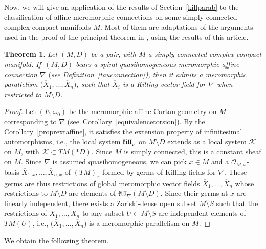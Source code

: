 \documentclass[pdftex]{sigma}
\numberwithin{equation}{section}
\newtheorem{Theorem}{Theorem}[section]
\begin{document}
Now, we will give an application of the results of Section~\ref{killparab} to the classification of affine meromorphic connections on some simply connected complex compact manifolds $M$. Most of them are adaptations of the arguments used in the proof of the principal theorem in \cite{BDM}, using the results of this article.

\begin{Theorem}\label{quasihomogeneousaffine} Let $(M,D)$ be a pair, with $M$ a simply connected complex compact manifold. If~$(M,D)$ bears a spiral quasihomogeneous meromorphic affine connection $\nabla$ $($see Definition~{\rm \ref{tauconnection})}, then it admits a meromorphic parallelism $\big(\overline{X}_1,\dots,\overline{X}_n\big)$, such that $\overline{X}_i$ is a Killing vector field for $\nabla$ when restricted to $M\setminus D$.

\end{Theorem}
\begin{proof}
 Let $(E,\omega_0)$ be the meromorphic affine Cartan geometry on $M$ corresponding to $\nabla$ (see~Corollary~\ref{equivalencetorsion}). By the Corollary~\ref{proprextaffine}, it satisfies the extension property of infinitesimal automorphisms, i.e., the local system $\mathfrak{k}\mathfrak{i}\mathfrak{l}\mathfrak{l}_{\nabla}$ on $M\setminus D$ extends as a local system $\mathcal{K}$ on $M$, with $\mathcal{K}\subset TM(* D)$. Since $M$ is simply connected, this is a constant sheaf on $M$. Since $\nabla$ is assumed quasihomogeneous, we can pick $x\in M$ and a $\mathcal{O}_{M,x}$-basis $\overline{X}_{1,x},\dots,\overline{X}_{n,x}$ of $(TM)_x$ formed by germs of Killing fields for $\nabla$. These germs are thus restrictions of global meromorphic vector fields $\overline{X}_1,\dots,\overline{X}_n$ whose restrictions to $M\setminus D$ are elements of $\mathfrak{k}\mathfrak{i}\mathfrak{l}\mathfrak{l}_\nabla(M\setminus D)$. Since their germs at $x$ are linearly independent, there exists a Zariski-dense open subset $M\setminus S$ such that the restrictions of $\overline{X}_1,\dots,\overline{X}_n$ to any subset $U\subset M\setminus S$ are independent elements of $TM(U)$, i.e., $\big(\overline{X}_1,\dots,\overline{X}_n\big)$ is a meromorphic parallelism on $M$.
\end{proof}

We obtain the following theorem.
\end{document}
